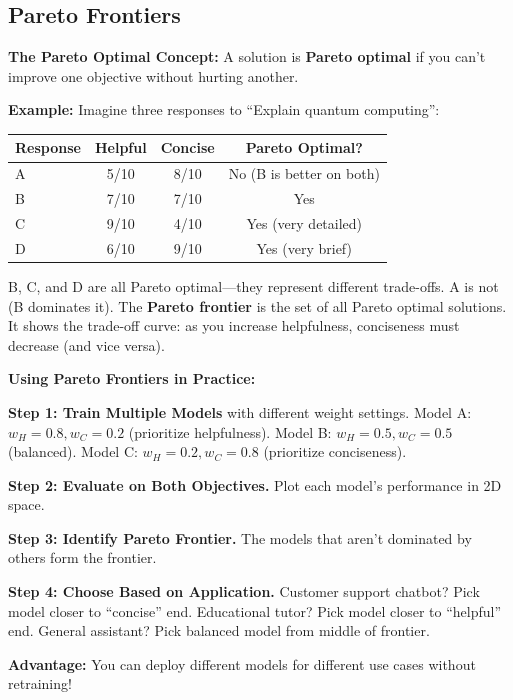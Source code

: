 \begin{chapterenv}
\section{Pareto Frontiers}

\textbf{The Pareto Optimal Concept:} A solution is \textbf{Pareto optimal} if you can't improve one objective without hurting another.

\textbf{Example:} Imagine three responses to ``Explain quantum computing'':

\begin{center}
\begin{tabular}{lccc}
\toprule
\textbf{Response} & \textbf{Helpful} & \textbf{Concise} & \textbf{Pareto Optimal?} \\
\midrule
A & 5/10 & 8/10 & No (B is better on both) \\
B & 7/10 & 7/10 & Yes \\
C & 9/10 & 4/10 & Yes (very detailed) \\
D & 6/10 & 9/10 & Yes (very brief) \\
\bottomrule
\end{tabular}
\end{center}

B, C, and D are all Pareto optimal---they represent different trade-offs. A is not (B dominates it). The \textbf{Pareto frontier} is the set of all Pareto optimal solutions. It shows the trade-off curve: as you increase helpfulness, conciseness must decrease (and vice versa).

\begin{infobox}
\textbf{Using Pareto Frontiers in Practice:}

\textbf{Step 1: Train Multiple Models} with different weight settings. Model A: $w_H = 0.8, w_C = 0.2$ (prioritize helpfulness). Model B: $w_H = 0.5, w_C = 0.5$ (balanced). Model C: $w_H = 0.2, w_C = 0.8$ (prioritize conciseness).

\textbf{Step 2: Evaluate on Both Objectives.} Plot each model's performance in 2D space.

\textbf{Step 3: Identify Pareto Frontier.} The models that aren't dominated by others form the frontier.

\textbf{Step 4: Choose Based on Application.} Customer support chatbot? Pick model closer to ``concise'' end. Educational tutor? Pick model closer to ``helpful'' end. General assistant? Pick balanced model from middle of frontier.

\textbf{Advantage:} You can deploy different models for different use cases without retraining!
\end{infobox}


\end{chapterenv}
